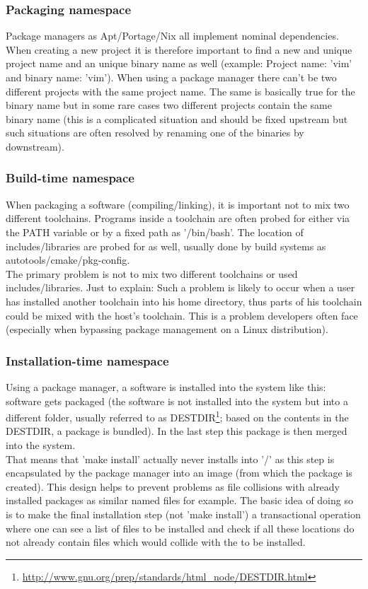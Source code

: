 \documentclass[a4paper,10pt]{article}
\begin{document}
\subsubsection{Packaging namespace}
Package managers as Apt/Portage/Nix all implement nominal dependencies. When creating a new project it is therefore important to find a new and unique project name and an unique binary name as well (example: Project name: 'vim' and binary name: 'vim'). When using a package manager there can't be two different projects with the same project name. The same is basically true for the binary name but in some rare cases two different projects contain the same binary name (this is a complicated situation and should be fixed upstream but such situations are often resolved by renaming one of the binaries by downstream).

\subsubsection{Build-time namespace}
When packaging a software (compiling/linking), it is important not to mix two different toolchains. Programs inside a toolchain are often probed for either via the PATH variable or by a fixed path as '/bin/bash'. The location of includes/libraries are probed for as well, usually done by build systems as autotools/cmake/pkg-config.  \\

The primary problem is not to mix two different toolchains or used includes/libraries. Just to explain: Such a problem is likely to occur when a user has installed another toolchain into his home directory, thus parts of his toolchain could be mixed with the host's toolchain. This is a problem developers often face (especially when bypassing package management on a Linux distribution).

\subsubsection{Installation-time namespace}
Using a package manager, a software is installed into the system like this: software gets packaged (the software is not installed into the system but into a different folder, usually referred to as DESTDIR\footnote{\url{http://www.gnu.org/prep/standards/html_node/DESTDIR.html}}; based on the contents in the DESTDIR, a package is bundled). In the last step this package is then merged into the system. \\

That means that 'make install' actually never installs into '/' as this step is encapsulated by the package manager into an image (from which the package is created). This design helps to prevent problems as file collisions with already installed packages as similar named files for example. The basic idea of doing so is to make the final installation step (not 'make install') a transactional operation where one can see a list of files to be installed and check if all these locations do not already contain files which would collide with the to be installed. \\
\end{document}
